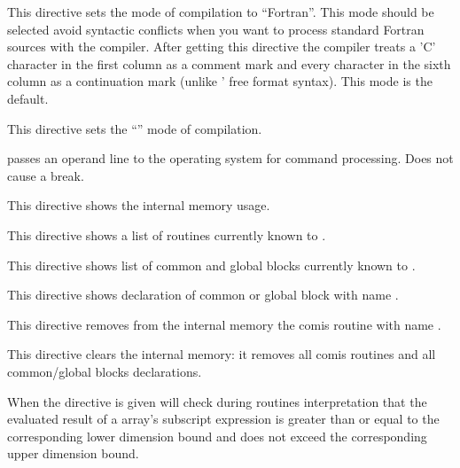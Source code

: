  
 
This directive sets the mode of compilation to ``Fortran''.
This mode should be selected avoid
syntactic conflicts when you want to process standard Fortran
sources with the \COMIS{} compiler. After getting this directive
the compiler treats a 'C' character in the first column
as a comment mark and every character in the sixth column
as a continuation mark (unlike \COMIS{}' free format syntax).
This mode is the default.
 
 
This directive sets the ``'' mode of compilation.
 
 
passes an operand line to the operating system for command
processing. Does not cause a break.
 

This directive shows the \COMIS{} internal memory usage.
 
 
This directive shows a list of routines currently known to \COMIS{}.
 
 
This directive shows list of common and global blocks
currently known to \COMIS{}.
 
 
This directive shows declaration of common or global block
with name .
 
 
This directive removes from the internal \COMIS{} memory the comis routine
with name .
 
 
This directive clears the internal \COMIS{} memory: it removes all comis
routines and all common/global blocks declarations.
 
 
When the directive  is given \COMIS{} will check during routines
interpretation that the evaluated result of a array's subscript
expression is greater than or equal to the corresponding lower dimension
bound and does not exceed the corresponding upper dimension bound.
 
